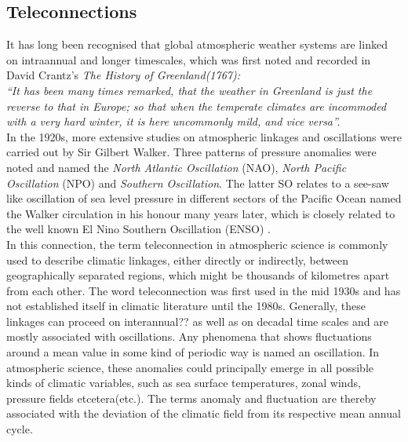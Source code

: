 \subsection{Teleconnections}
\label{sub:tele}
It has long been recognised that global atmospheric weather systems are linked on intraannual and longer timescales, which was first noted and recorded in David Crantz’s
\textit{The History of Greenland(1767):\\
“It has been many times remarked, that the weather in Greenland is just the reverse to that in Europe; so that when the temperate climates are incommoded with a very hard winter, it is here uncommonly mild, and vice versa”.}\cite{Kidston2009}\\

In the 1920s, more extensive studies on atmospheric linkages and oscillations were carried out by Sir Gilbert Walker. Three patterns of pressure anomalies were noted and named the \textit{North Atlantic Oscillation} (NAO), \textit{North Pacific Oscillation} (NPO) and \textit{Southern Oscillation}. The latter SO relates to a see-saw like oscillation of sea level pressure in different sectors of the Pacific Ocean named the Walker circulation in his honour many years later, which is closely related to the well known El Nino Southern Oscillation (ENSO) \cite{Gong1999} \cite{WALKER1923}. \\

In this connection, the term teleconnection in atmospheric science is commonly used to describe climatic linkages, either directly or indirectly, between geographically separated regions, which might be thousands of kilometres apart from each other. The word teleconnection was first used in the mid 1930s \cite{Angstrom1935} and has not established itself in climatic literature  until the 1980s. Generally, these linkages can proceed on interannual?? as well as on decadal time scales and are mostly associated with oscillations. Any phenomena that shows fluctuations around a mean value in some kind of periodic way is named an oscillation. 
 In atmospheric science, these anomalies  could principally emerge in all possible kinds of climatic variables, such as sea surface temperatures, zonal winds,  pressure fields etcetera(etc.). The terms anomaly and fluctuation are thereby associated with the deviation of the climatic field from its respective mean annual cycle.
 
